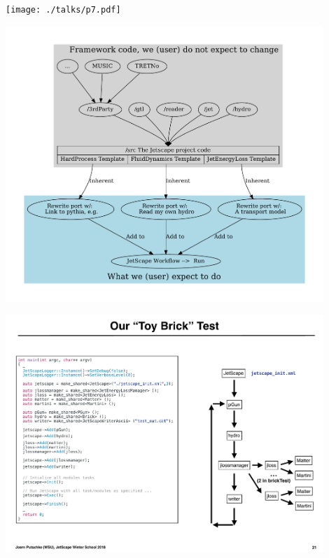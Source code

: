 \documentclass[11pt]{beamer}
\begin{document}
\begin{frame}
\begin{center}
\texttt{[image: ./talks/p7.pdf]}
\end{center}
\end{frame}

\begin{frame}
\begin{center}
\includegraphics[width=0.9\textwidth]{./framework.pdf}
\end{center}
\end{frame}

\begin{frame}
\begin{center}
\includegraphics[width=0.9\textwidth]{./talks/p38.pdf}
\end{center}
\end{frame}
\end{document}
